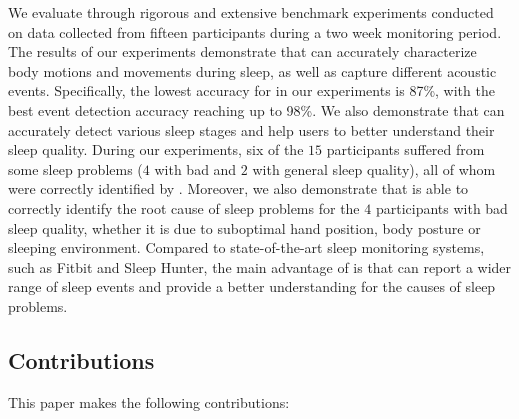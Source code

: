 
We evaluate \systemname through rigorous and extensive benchmark experiments conducted on data collected from fifteen participants during a
two week monitoring period. The results of our experiments demonstrate that \systemname can accurately characterize body motions and
movements during sleep, as well as capture different acoustic events. Specifically, the lowest accuracy for \systemname in our experiments
is 87\%, with the best event detection accuracy reaching up to 98\%. We also demonstrate
that \systemname can accurately detect various sleep stages and help users to better understand their sleep quality. During our experiments, six of the $15$ participants suffered from some sleep problems ($4$ with bad and $2$ with general sleep quality), all of whom were correctly identified by \systemname. Moreover, we also demonstrate that \systemname is able to correctly identify the root cause of sleep problems for the $4$ participants with bad sleep quality, whether it is due to suboptimal hand position, body posture or sleeping environment. Compared to state-of-the-art sleep monitoring systems, such as Fitbit and Sleep Hunter, the main advantage of \systemname is that can report a wider range of sleep events and provide a better understanding for the causes of sleep problems. %


\subsection*{Contributions}
This paper makes the following contributions:

